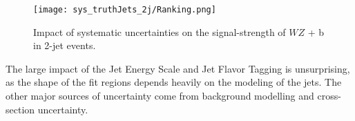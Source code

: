 \begin{figure}[H]
    \centering
    \texttt{[image: sys\_truthJets\_2j/Ranking.png]}
    \caption{Impact of systematic uncertainties on the signal-strength of $WZ$ + b in 2-jet events.}
    \label{fig:ranking_2j}
\end{figure}

The large impact of the Jet Energy Scale and Jet Flavor Tagging is unsurprising, as the shape of the fit regions depends heavily on the modeling of the jets. The other major sources of uncertainty come from background modelling and cross-section uncertainty. %



